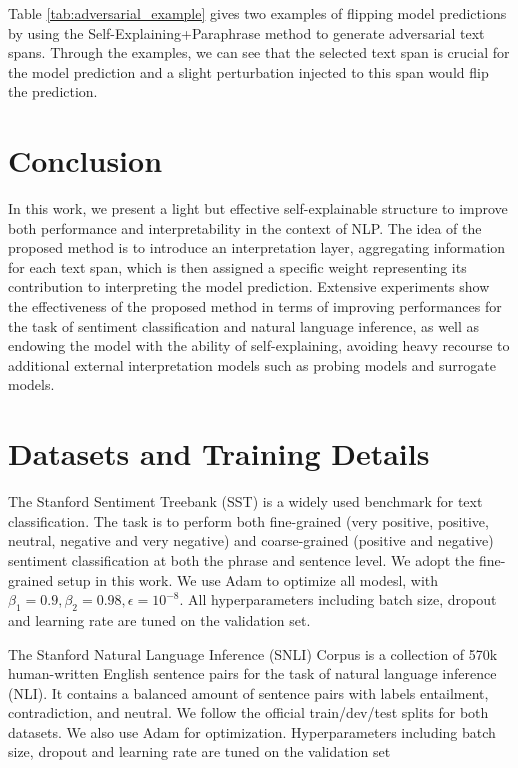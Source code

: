 \documentclass[11pt,a4paper]{article}
\begin{document}
Table \ref{tab:adversarial_example} gives two examples of flipping model predictions by using the Self-Explaining+Paraphrase method to generate adversarial text spans. Through the examples, we can see that the selected text span is crucial for the model prediction and a slight perturbation injected to this span would flip the prediction.

\section{Conclusion}
In this work, we present a light but effective self-explainable structure to improve both performance and interpretability in the context of NLP.  The idea of the proposed method is to introduce an interpretation layer, aggregating information for each text span, which is then assigned a specific weight representing its contribution to interpreting  the model prediction. Extensive experiments show the effectiveness of the proposed method in terms of improving performances for the task of sentiment classification and natural language inference, as well as endowing the model with the ability of self-explaining, avoiding heavy recourse to additional external interpretation models such as probing models and surrogate models. 





\appendix

\section{Datasets and Training Details}
The Stanford Sentiment Treebank (SST) \citep{socher2013recursive} is a widely used benchmark for text classification. The task is to perform both fine-grained (very positive, positive, neutral, negative and very negative) and coarse-grained (positive and negative) sentiment classification at both the phrase and sentence level. We adopt the fine-grained setup in this work. We use Adam \citep{kingma2014adam} to optimize all modesl, with $\beta_1=0.9,\beta_2=0.98,\epsilon=10^{-8}$. All hyperparameters including batch size, dropout and learning rate are tuned on the validation set.

The Stanford Natural Language Inference (SNLI) Corpus \citep{bowman2015large} is a collection of 570k human-written English sentence pairs for the task of natural language inference (NLI). It contains a balanced amount of sentence pairs with  labels entailment, contradiction, and neutral. We follow the official train/dev/test splits for both datasets. We also use Adam \citep{kingma2014adam} for optimization. 
Hyperparameters including batch size, dropout and learning rate are tuned on the validation set 
\end{document}
